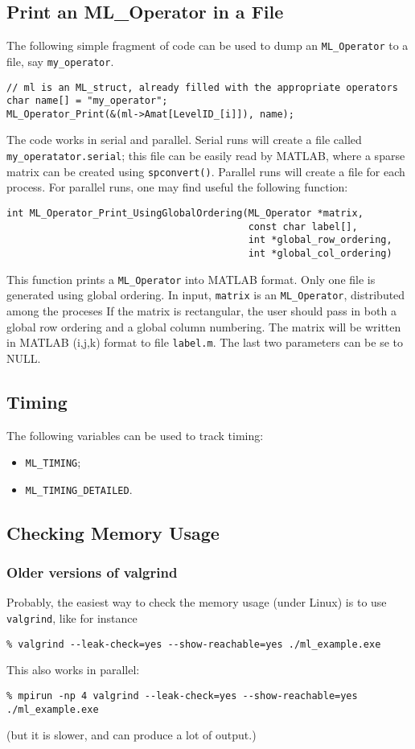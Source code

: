\documentclass[10pt,letter,relax]{SANDreport}
\begin{document}
\subsection{Print an ML\_Operator in a File}

The following simple fragment of code can be used to dump an
\verb!ML_Operator! to a file, say \verb!my_operator!.
\begin{verbatim}
// ml is an ML_struct, already filled with the appropriate operators
char name[] = "my_operator";
ML_Operator_Print(&(ml->Amat[LevelID_[i]]), name);
\end{verbatim}
The code works in serial and parallel. Serial runs will create a file called
\verb!my_operatator.serial!; this file can be easily read by MATLAB, where a
sparse matrix can be created using \verb!spconvert()!. Parallel runs will
create a file for each process. For parallel runs, one may find useful the
following function:
\begin{verbatim}
int ML_Operator_Print_UsingGlobalOrdering(ML_Operator *matrix,
                                          const char label[],
                                          int *global_row_ordering,
                                          int *global_col_ordering)
\end{verbatim}
This function prints a \verb!ML_Operator! into MATLAB format. Only one file is generated using global ordering. 
In input, \verb!matrix! is an \verb!ML_Operator!, distributed among the proceses     
If the matrix is rectangular, the user should   pass in both a global row
ordering and a global column numbering. The
matrix will be written in MATLAB (i,j,k) format to file \verb!label.m!. The
last two parameters can be se to NULL.

\subsection{Timing}

The following variables can be used to track timing:
\begin{itemize}
\item \verb!ML_TIMING!;
\item \verb!ML_TIMING_DETAILED!.
\end{itemize}

\subsection{Checking Memory Usage}

\subsubsection{Older versions of valgrind}
Probably, the easiest way to check the memory usage (under Linux) is to use
\verb!valgrind!, like for instance
\begin{verbatim}
% valgrind --leak-check=yes --show-reachable=yes ./ml_example.exe
\end{verbatim}
This also works in parallel:
\begin{verbatim}
% mpirun -np 4 valgrind --leak-check=yes --show-reachable=yes ./ml_example.exe
\end{verbatim}
(but it is slower, and can produce a lot of output.)
\end{document}
